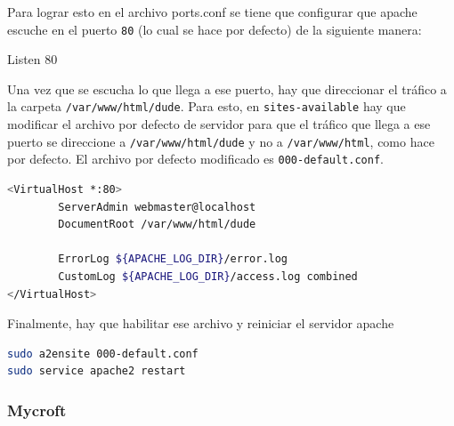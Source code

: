 Para lograr esto en el archivo ports.conf se tiene que configurar que apache escuche en el puerto \lstinline[columns=fixed]{80} (lo cual se hace por defecto) de la siguiente manera:

Listen 80

Una vez que se escucha lo que llega a ese puerto, hay que direccionar el tráfico a la carpeta \lstinline[columns=fixed]{/var/www/html/dude}. Para esto, en \lstinline[columns=fixed]{sites-available} hay que modificar el archivo por defecto de servidor para que el tráfico que llega a ese puerto se direccione a \lstinline[columns=fixed]{/var/www/html/dude} y no a \lstinline[columns=fixed]{/var/www/html}, como hace por defecto. El archivo por defecto modificado es \lstinline[columns=fixed]{000-default.conf}.

\begin{lstlisting}[language=bash]
<VirtualHost *:80>
        ServerAdmin webmaster@localhost
        DocumentRoot /var/www/html/dude

        ErrorLog ${APACHE_LOG_DIR}/error.log
        CustomLog ${APACHE_LOG_DIR}/access.log combined
</VirtualHost>
\end{lstlisting}

Finalmente, hay que habilitar ese archivo y reiniciar el servidor apache 

\begin{lstlisting}[language=bash]
sudo a2ensite 000-default.conf
sudo service apache2 restart
\end{lstlisting}



\subsubsection{Mycroft}

